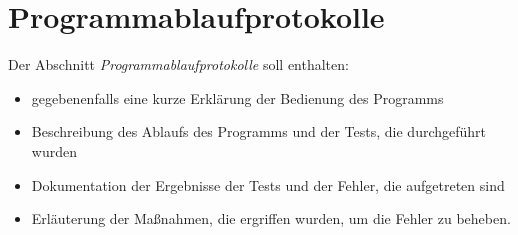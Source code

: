 \chapter{Programmablaufprotokolle}

Der Abschnitt \emph{Programmablaufprotokolle} soll enthalten:

\begin{itemize}
 \item gegebenenfalls eine kurze Erklärung der Bedienung des Programms
 \item Beschreibung des Ablaufs des Programms und der Tests, die durchgeführt wurden
 \item Dokumentation der Ergebnisse der Tests und der Fehler, die aufgetreten sind
 \item Erläuterung der Maßnahmen, die ergriffen wurden, um die Fehler zu beheben.
\end{itemize}
